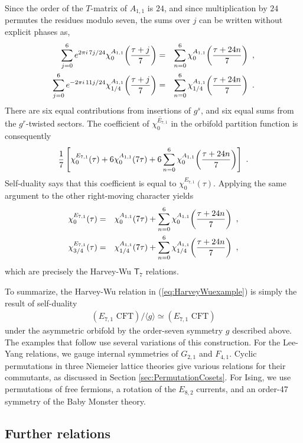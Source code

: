 \documentclass[12pt]{article}
\numberwithin{equation}{section}
\newcommand{\bea}{\begin{eqnarray}}
\newcommand{\eea}{\end{eqnarray}}
\def\no{\nonumber}
\theoremstyle{remark}
\begin{document}
Since the order of the $T$-matrix of $A_{1,1}$ is $24$, and since multiplication by $24$ permutes the residues modulo seven, the sums over $j$ can be written without explicit phases as,
\bea
\sum_{j=0}^6e^{2\pi i\,7j/24}\chi^{A_{1,1}}_0\!\left({\tau+j\over 7}\right)
&=&\sum_{n=0}^6\chi^{A_{1,1}}_0\!\left({\tau+24n\over 7}\right)~,\no\\
\sum_{j=0}^6e^{-2\pi i\,11j/24}\chi^{A_{1,1}}_{1/4}\!\left({\tau+j\over 7}\right)
&=&\sum_{n=0}^6\chi^{A_{1,1}}_{1/4}\!\left({\tau+24n\over 7}\right)~.
\eea
There are six equal contributions from insertions of $g^s$, and six equal sums from the  $g^r$-twisted sectors. The coefficient of $\overline{\chi^{E_{7,1}}_0}$ in the orbifold partition function is consequently
\bea
{1\over 7}\left[
\chi^{E_{7,1}}_0(\tau)+6\chi^{A_{1,1}}_0(7\tau)
+6\sum_{n=0}^6\chi^{A_{1,1}}_0\!\left({\tau+24n\over 7}\right)
\right]~.
\eea
Self-duality says that this coefficient is equal to $\chi^{E_{7,1}}_0(\tau)$. Applying the same argument to the other right-moving character yields
\bea
\label{eq:E7A1finalrelation}
\chi^{E_{7,1}}_0(\tau)
&=&\chi^{A_{1,1}}_0(7\tau)
+\sum_{n=0}^{6}\chi^{A_{1,1}}_0\!\left({\tau+24n\over 7}\right)~,\no\\
\chi^{E_{7,1}}_{3/4}(\tau)
&=&\chi^{A_{1,1}}_{1/4}(7\tau)
+\sum_{n=0}^{6}\chi^{A_{1,1}}_{1/4}\!\left({\tau+24n\over 7}\right)~,
\eea
which are precisely the Harvey-Wu $\mathsf T_7$ relations. 

To summarize, the Harvey-Wu relation in (\ref{eq:HarveyWuexample}) is simply the result of self-duality 
\bea
(E_{7,1} \,\,\mathrm{CFT}) / \langle g \rangle \simeq (E_{7,1} \,\,\mathrm{CFT})
\eea
under the asymmetric orbifold by the order-seven symmetry $g$ described above.  The examples that follow use several variations of this construction. For the Lee-Yang relations, we gauge internal symmetries of $G_{2,1}$ and $F_{4,1}$. Cyclic permutations in three Niemeier lattice theories give various relations for their commutants, as discussed in Section \ref{sec:PermutationCosets}. For Ising, we use permutations of free fermions, a rotation of the $E_{8,2}$ currents, and an order-47 symmetry of the Baby Monster theory. 

\subsection{Further relations}
\end{document}
